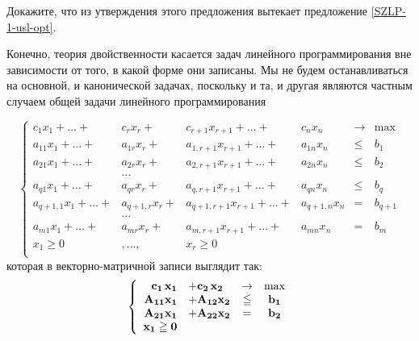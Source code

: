 \begin{exer}
    Докажите, что из утверждения этого предложения вытекает
    предложение \ref{SZLP-1-usl-opt}.
\end{exer}


    Конечно, теория двойственности касается задач линейного
    программирования вне зависимости от того, в какой форме они записаны.
    Мы не будем останавливаться на основной,
    и канонической  задачах, поскольку и та, и другая являются
    частным случаем общей задачи линейного программирования

\begin{equation*}
\left\{
\begin{array}{rrrrll}
    c_1 x_1  +  \ldots + & c_r x_r+     & c_{r+1}x_{r+1}    +\ldots +  &c_n x_n    &\to  & \max \\
    a_{11} x_1 +  \ldots + & a_{1r} x_r+  & a_{1,r+1} x_{r+1} +\ldots +  &a_{1n} x_n &\leqslant & b_1  \\
    a_{21} x_1 +  \ldots + & a_{2r} x_r+  & a_{2,r+1} x_{r+1} +\ldots +  &a_{2n} x_n &\leqslant & b_2 \\
                                  & \ldots &&&&\\
    a_{q1} x_1 +  \ldots + & a_{qr} x_r+  & a_{q,r+1} x_{r+1} +\ldots +  &a_{qn} x_n &\leqslant & b_q  \\
    a_{q+1,1} x_1 +  \ldots + & a_{q+1,r} x_r+ & a_{q+1,r+1} x_{r+1} +\ldots + &a_{q+1,n} x_n &= & b_{q+1}  \\
                                  & \ldots &&&&\\
    a_{m1} x_1 +  \ldots + & a_{mr} x_r+ & a_{m,r+1} x_{r+1} +\ldots + &a_{mn} x_n &= & b_m  \\
             x_1 \ge 0&,  \ldots, \quad  &x_r \ge 0&&&\\
\end{array} \right.
\end{equation*}
    которая в векторно-матричной записи выглядит так:
    \begin{equation}\label{OZLPV-2}
\left\{
\begin{array}{rlcc}
    \mathbf{c_1} \, \mathbf{x_1} &+ \mathbf{c_2} \, \mathbf{x_2} &\to & \max \\
   \mathbf{A_{11}} \mathbf{x_1}          &+ \mathbf{A_{12}} \mathbf{x_2} & \leqq &\mathbf{b_1}\\
  \mathbf{A_{21}}  \mathbf{x_1}          &+ \mathbf{A_{22}} \mathbf{x_2} & = &\mathbf{b_2}\\
  \mathbf{x_1} \geqq \mathbf{0}&\\
\end{array} \right.
\end{equation}

